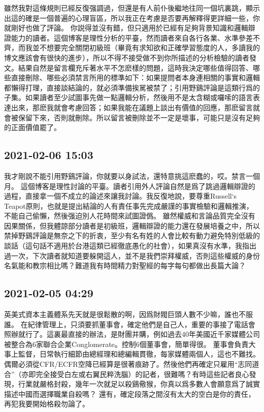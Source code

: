 \documentclass[twocolumn]{ctexart}
\begin{document}
雖然我對這條規則已經反復强調過，但還是有人前仆後繼地往同一個坑裏跳，顯示出這的確是一個普遍的心理盲區，所以我正在考慮是否要再解釋得更詳細一些，你就剛好也做了評論。
你説得並沒有錯，但只適用於已經有足夠背景知識和邏輯辯證能力的讀者。這個博客是理性分析的平臺，然而讀者來自各行各業、水準參差不齊，而我並不想要完全關閉初級班（畢竟有求知欲和正確學習態度的人，多讀我的博文應該會有很快的進步），所以不得不接受做不到你所描述的分析檢驗的讀者發文。結果自然是留言欄充斥著水平不怎麽樣的問題，這時我決定哪些值得回答、哪些直接刪除、哪些必須禁言所用的標準如下：如果提問者本身連相關的事實和邏輯都懶得打理，直接談結論的，就必須準備挨駡被禁了；引用野鷄評論是這類行爲的子集。如果讀者至少試圖事先做一點邏輯分析，然後用不是太含糊或囉嗦的語言表達出來，那麽我就會考慮回答；如果我能在議題上談出有價值的回應，那麽留言就會被保留下來，否則就刪除。所以留言被刪除並不一定是壞事，可能只是沒有足夠的正面價值罷了。
\subsection*{2021-02-06 15:03}

我才剛說不能引用野鷄評論，你就要以身試法，還特意挑這麽蠢的，哎。禁言一個月。
這個博客是理性討論的平臺。讀者引用外人評論自然是爲了跳過邏輯辯證的過程，直接拿一個不成立的論述來讓我討論。我反復地說，要尊重Russell‘s Teapot原則，也就是提出結論的人有責任事先完成嚴謹的事實檢驗和邏輯推演，不能自己偷懶，然後强迫別人花時間來試圖證僞。
雖然權威和言論品質完全沒有因果關係，但我體諒部分讀者是初級班，邏輯辯證的能力還在發展培養之中，所以禁掉野鷄評論是無奈之下的折衷，至少有名有姓的人會比較有動力避免特別低級的談話（這句話不適用於台港這類已經徹底愚化的社會），如果真沒有水準，我指出過一次，下次讀者就知道要躲開這人，並不是我們崇拜權威，否則這些權威的身份名氣能和教宗相比嗎？難道我有時間精力對聖經的每字每句都做出長篇大論？
\subsection*{2021-02-05 04:29}

英美式資本主義體系先天就是很鬆散的啊，因爲財閥巨頭人數不少嘛，誰也不服誰。
在紀律管理上，只須要抓董事會，確定他們是自己人，重要的事接了電話會照辦就行了。這裏最直接的辦法，是財團并購，例如過去40年美國近千家媒體公司被整合為6家聯合企業Conglomerate。控制6個董事會，簡單得很。
董事會負責大事上監督，日常執行細節由總經理和總編輯貫徹，每家媒體兩個人，這也不難找。偶爾必須從CFR/ECFR空降已經算是很著痕跡了。然後他們再確定只雇用“志同道合”（亦即完全接受白左或右翼民粹洗腦）的記者，很難嗎？有時這些記者良心發現，行業就嚴格封殺，幾年一次就足以殺鷄儆猴，你真以爲多數人會願意爲了誠實描述中國而選擇職業自殺嗎？
還有，確定段落之間沒有太大的空白是你的責任，再犯我要開始格殺勿論了。
\end{document}
